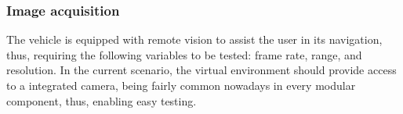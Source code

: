 %

%
%
%
\subsubsection{Image acquisition}%
\label{sec:orgb1f5c2a}
The vehicle is equipped with remote vision to assist the user in its navigation,
thus, requiring the following variables to be tested: frame rate, range, and
resolution. In the current scenario, the virtual environment should provide
access to a integrated camera, being fairly common nowadays in every modular component, thus, enabling easy testing.

